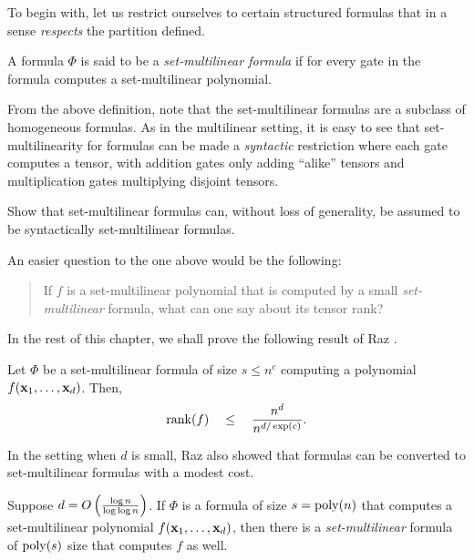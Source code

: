 To begin with, let us restrict ourselves to certain structured formulas that in a sense \emph{respects} the partition defined. 

\begin{definition} A formula $\Phi$ is said
  to be a \emph{set-multilinear formula} if for every gate in the formula computes a set-multilinear polynomial.
\end{definition}

From the above definition, note that the set-multilinear formulas are a subclass of homogeneous formulas.
As in the multilinear setting, it is easy to see that set-multilinearity for formulas can be made a \emph{syntactic} restriction where each gate computes a tensor, with addition gates only adding ``alike'' tensors and multiplication gates multiplying disjoint tensors.

\begin{exercise}
  Show that set-multilinear formulas can, without loss of generality, be assumed to be syntactically set-multilinear formulas.
\end{exercise}

\noindent
An easier question to the one above would be the following:

\begin{quote}
  If $f$ is a set-multilinear polynomial that is computed by a small \emph{set-multilinear} formula, what can one say about its tensor rank?
\end{quote}

In the rest of this chapter, we shall prove the following result of Raz \cite{raz10}. 

\begin{theorem} \label{thm:raz-tensorrank-sml} Let
  $\Phi$ be a set-multilinear formula of size $s \leq n^c$ computing a polynomial $f(\mathbf{x}_1,\ldots, \mathbf{x}_d)$.
Then,
\[
\operatorname{rank}(f) \quad \leq \quad \frac{n^d}{n^{d/\exp(c)}}. 
\] 
\end{theorem}

In the setting when $d$ is small, Raz \cite{raz10} also showed that formulas can be converted to set-multilinear formulas with a modest cost. 

\begin{theorem}\label{thm:form-to-smlform}
  Suppose $d = O\left(\frac{\log n}{\log\log n}\right)$.
If $\Phi$ is a formula of size $s = \operatorname{poly}(n)$ that computes a set-multilinear polynomial $f(\mathbf{x}_1,\ldots, \mathbf{x}_d)$, then there is a \emph{set-multilinear} formula of $\operatorname{poly}(s)$ size that computes $f$ as well.
\end{theorem}

